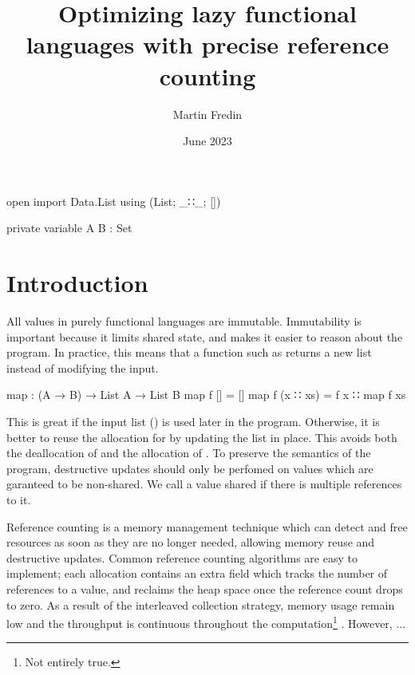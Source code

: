 \documentclass{article}
\title{Optimizing lazy functional languages with precise reference counting}
\author{Martin Fredin}
\date{June 2023}
\begin{document}
\maketitle

\begin{code}[hide]



open import Data.List using (List; _∷_; [])

private 
  variable
    A B : Set

\end{code}

\section{Introduction}

All values in purely functional languages are immutable.
Immutability is important because it limits shared state, and makes it easier to reason about the program.
In practice, this means that a function such as  returns a new list instead of modifying the input.
\begin{code}
map : (A → B) → List A → List B
map f []       = []
map f (x ∷ xs) = f x ∷ map f xs
\end{code}
This is great if the input list (\AgdaSpace{}) is used later in the program. 
Otherwise, it is better to reuse the allocation for \AgdaSpace{} by updating the list in place. 
This avoids both the deallocation of \AgdaSpace{} and the allocation of \AgdaSpace{}.
To preserve the semantics of the program, destructive updates should only be perfomed on values which are garanteed to be non-shared. 
We call a value shared if there is multiple references to it.

Reference counting \citep{collins1960} is a memory management technique which can detect and free resources as soon as they are no longer needed, allowing memory reuse and destructive updates. 
Common reference counting algorithms are easy to implement; each allocation contains an extra field which tracks the number of references to a value, and reclaims the heap space once the reference count drops to zero. 
As a result of the interleaved collection strategy, memory usage remain low and the throughput is continuous throughout the computation\footnote{Not entirely true.} \citep{jones1996}.
However, ...
\end{document}
